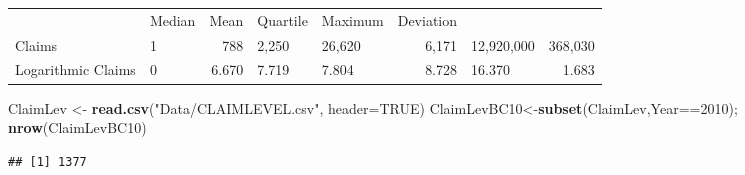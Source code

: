 \documentclass[]{book}
\newenvironment{Shaded}{\begin{snugshade}}{\end{snugshade}}
\newcommand{\KeywordTok}[1]{\textcolor[rgb]{0.13,0.29,0.53}{\textbf{{#1}}}}
\newcommand{\DataTypeTok}[1]{\textcolor[rgb]{0.13,0.29,0.53}{{#1}}}
\newcommand{\DecValTok}[1]{\textcolor[rgb]{0.00,0.00,0.81}{{#1}}}
\newcommand{\StringTok}[1]{\textcolor[rgb]{0.31,0.60,0.02}{{#1}}}
\newcommand{\OtherTok}[1]{\textcolor[rgb]{0.56,0.35,0.01}{{#1}}}
\newcommand{\NormalTok}[1]{{#1}}
\begin{document}
\begin{longtable}[]{@{}llrllrlr@{}}
\begin{minipage}[t]{0.12\columnwidth}
\end{minipage} & \begin{minipage}[t]{0.12\columnwidth}\raggedright\strut
Median\strut
\end{minipage} & \begin{minipage}[t]{0.12\columnwidth}\raggedright\strut
Mean\strut
\end{minipage} & \begin{minipage}[t]{0.12\columnwidth}\raggedleft\strut
Quartile\strut
\end{minipage} & \begin{minipage}[t]{0.12\columnwidth}\raggedright\strut
Maximum\strut
\end{minipage} & \begin{minipage}[t]{0.12\columnwidth}\raggedleft\strut
Deviation\strut
\end{minipage}\tabularnewline
Claims & 1 & 788 & 2,250 & 26,620 & 6,171 & 12,920,000 &
368,030\tabularnewline
Logarithmic Claims & 0 & 6.670 & 7.719 & 7.804 & 8.728 & 16.370 &
1.683\tabularnewline
\bottomrule
\end{longtable}

\begin{Shaded}
\begin{Highlighting}[]
\NormalTok{ClaimLev <-}\StringTok{ }\KeywordTok{read.csv}\NormalTok{(}\StringTok{"Data/CLAIMLEVEL.csv"}\NormalTok{, }\DataTypeTok{header=}\OtherTok{TRUE}\NormalTok{)}
\NormalTok{ClaimLevBC10<-}\KeywordTok{subset}\NormalTok{(ClaimLev,Year==}\DecValTok{2010}\NormalTok{); }\KeywordTok{nrow}\NormalTok{(ClaimLevBC10)}
\end{Highlighting}
\end{Shaded}

\begin{verbatim}
## [1] 1377
\end{verbatim}

\begin{Shaded}
\end{Shaded}
\end{document}
